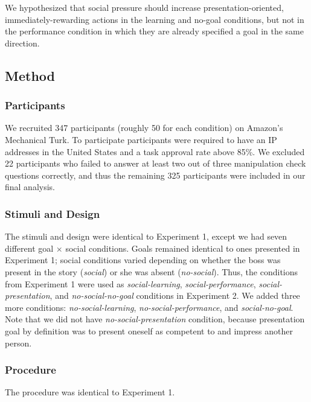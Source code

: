 \documentclass[10pt, letterpaper]{article}
\begin{document}
We hypothesized that social pressure should increase
presentation-oriented, immediately-rewarding actions in the learning and
no-goal conditions, but not in the performance condition in which they
are already specified a goal in the same direction.

\subsection{Method}\label{method-1}

\subsubsection{Participants}\label{participants-1}

We recruited 347 participants (roughly 50 for each condition) on
Amazon's Mechanical Turk. To participate participants were required to
have an IP addresses in the United States and a task approval rate above
85\%. We excluded 22 participants who failed to answer at least two out
of three manipulation check questions correctly, and thus the remaining
325 participants were included in our final analysis.

\subsubsection{Stimuli and Design}\label{stimuli-and-design-1}

The stimuli and design were identical to Experiment 1, except we had
seven different goal \(\times\) social conditions. Goals remained
identical to ones presented in Experiment 1; social conditions varied
depending on whether the boss was present in the story (\emph{social})
or she was absent (\emph{no-social}). Thus, the conditions from
Experiment 1 were used as \emph{social-learning},
\emph{social-performance}, \emph{social-presentation}, and
\emph{no-social-no-goal} conditions in Experiment 2. We added three more
conditions: \emph{no-social-learning}, \emph{no-social-performance}, and
\emph{social-no-goal}. Note that we did not have
\emph{no-social-presentation} condition, because presentation goal by
definition was to present oneself as competent to and impress another
person.

\subsubsection{Procedure}\label{procedure-1}

The procedure was identical to Experiment 1.
\end{document}
